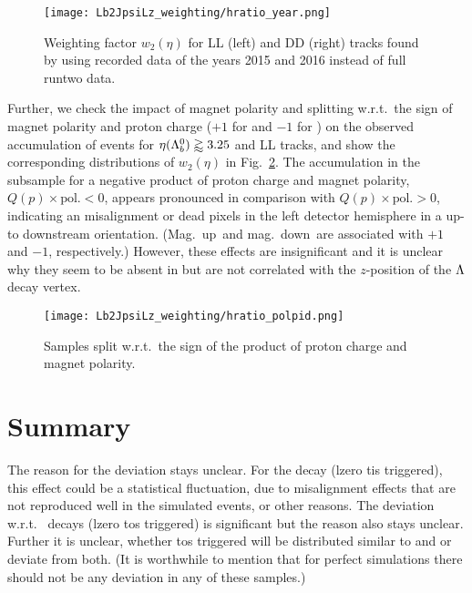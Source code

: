 \begin{figure}[htbp]
    \centering
    \texttt{[image: Lb2JpsiLz\_weighting/hratio\_year.png]}
    \caption{Weighting factor $w_2(\eta)$ for \gls{LL} (left) and \gls{DD} (right) tracks found by using recorded data of the years 2015 and 2016 instead of full \gls{runtwo} data.}
    \label{fig:LbToJpsiLz_hratio_year}
\end{figure}

Further, we check the impact of magnet polarity and splitting w.r.t.\ the sign of magnet polarity and proton charge ($+1$ for \proton and $-1$ for \antiproton) on the observed accumulation of events for $\eta({{\Lambda}^0_{b}}) \gtrapprox 3.25$ and \gls{LL} tracks, and show the corresponding distributions of $w_2(\eta)$ in Fig.~\ref{fig:LbToJpsiLz_hratio_polpid}.
The accumulation in the subsample for a negative product of proton charge and magnet polarity, $Q(p) \times \text{pol.} < 0$, appears pronounced in comparison with $Q(p) \times \text{pol.} > 0$, indicating an misalignment or dead pixels in the left detector hemisphere in a up- to downstream orientation.
(Mag.\ up\ and mag.\ down\ are associated with $+1$ and $-1$, respectively.)
However, these effects are insignificant and it is unclear why they seem to be absent in \decay{\Lb}{\Dz\proton\pim} but are not correlated with the $z$-position of the ${\Lambda}$ decay vertex.

\begin{figure}[htbp]
    \centering
    \texttt{[image: Lb2JpsiLz\_weighting/hratio\_polpid.png]}
    \caption{Samples split w.r.t.\ the sign of the product of proton charge and magnet polarity.}
    \label{fig:LbToJpsiLz_hratio_polpid}
\end{figure}

\section{Summary}
The reason for the deviation stays unclear.
For the decay \decay{\Lb}{\jpsi\Lz} (\gls{lzero} \gls{tis} triggered), this effect could be a statistical fluctuation, due to misalignment effects that are not reproduced well in the simulated events, or other reasons.
The deviation w.r.t.\ \decay{\Lb}{\Dz\proton\pim} decays (\gls{lzero} \gls{tos} triggered) is significant but the reason also stays unclear.
Further it is unclear, whether \gls{tos} triggered \decay{\Lb}{\Dz\Lz} will be distributed similar to \decay{\Lb}{\jpsi\Lz} and \decay{\Lb}{\Dz\proton\pim} or deviate from both.
(It is worthwhile to mention that for perfect simulations there should not be any deviation in any of these samples.)
